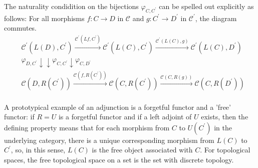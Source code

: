 \begin{example}
The naturality condidition on the bijections $\varphi_{C, C^{\prime}}$ can be spelled out explicitly as follows: For all morphisms $f: C \rightarrow D$ in $\mathcal{C}$ and $g: C^{\prime} \rightarrow D^{\prime}$ in $\mathcal{C}^{\prime}$, the diagram commutes.
$$
\begin{aligned}
& \mathcal{C}^{\prime}\left(L(D), C^{\prime}\right) \xrightarrow{\mathcal{C}^{\prime}\left(L f, C^{\prime}\right)} \mathcal{C}^{\prime}\left(L(C), C^{\prime}\right) \xrightarrow{\mathcal{C}^{\prime}(L(C), g)} \mathcal{C}^{\prime}\left(L(C), D^{\prime}\right) \\
& \varphi_{D, C^{\prime}} \downarrow \downarrow \varphi_{C, C^{\prime}} \downarrow \varphi_{C, D^{\prime}} \\
& \mathcal{C}\left(D, R\left(C^{\prime}\right)\right) \xrightarrow{\mathcal{C}\left(f, R\left(C^{\prime}\right)\right)} \mathcal{C}\left(C, R\left(C^{\prime}\right)\right) \xrightarrow{\mathcal{C}(C, R(g))} \mathcal{C}\left(C, R\left(D^{\prime}\right)\right) \\
&
\end{aligned}
$$

\begin{example}
A prototypical example of an adjunction is a forgetful functor and a 'free' functor: if $R=U$ is a forgetful functor and if a left adjoint of $U$ exists, then the defining property means that for each morphism from $C$ to $U\left(C^{\prime}\right)$ in the underlying category, there is a unique corresponding morphism from $L(C)$ to $C^{\prime}$, so, in this sense, $L(C)$ is the free object associated with $C$. For topological spaces, the free topological space on a set is the set with discrete topology.
\end{example}


\end{example}
